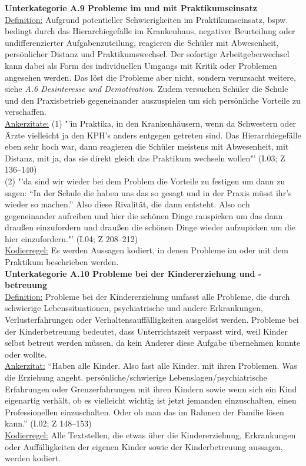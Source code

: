 \textbf{Unterkategorie A.9 Probleme im und mit Praktikumseinsatz}\\
\underline{Definition:} Aufgrund potentieller Schwierigkeiten im Praktikumseinsatz, bspw. bedingt durch das Hierarchiegefälle im Krankenhaus, negativer Beurteilung oder undifferenzierter Aufgabenzuteilung, reagieren die Schüler mit Abwesenheit, persönlicher Distanz und Praktikumswechsel. Der sofortige Arbeitgeberwechsel kann dabei als Form des individuellen Umgangs mit Kritik oder Problemen angesehen werden. Das löst die Probleme aber nicht, sondern verursacht weitere, siehe \textit{A.6 Desinteresse und Demotivation}. Zudem versuchen Schüler die Schule und den Praxisbetrieb gegeneinander auszuspielen um sich persönliche Vorteile zu verschaffen.\\
\underline{Ankerzitate:} (1) "'in Praktika, in den Krankenhäusern, wenn da Schwestern oder Ärzte vielleicht ja den KPH's anders entgegen getreten sind. Das Hierarchiegefälle eben sehr hoch war, dann reagieren die Schüler meistens mit Abwesenheit, mit Distanz, mit ja, das sie direkt gleich das Praktikum wechseln wollen"' (I.03; Z 136--140)\\ (2) "'da sind wir wieder bei dem Problem die Vorteile zu festigen um dann zu sagen: "`In der Schule die haben uns das so gesagt und in der Praxis müsst ihr's wieder so machen."' Also diese Rivalität, die dann entsteht. Also och gegeneinander aufreiben und hier die schönen Dinge rauspicken um das dann draußen einzufordern und draußen die schönen Dinge wieder aufzupicken um die hier einzufordern."' (I.04; Z 208--212)\\
\underline{Kodierregel:} Es werden Aussagen kodiert, in denen Probleme im oder mit dem Praktikum beschrieben werden.\\

\textbf{Unterkategorie A.10 Probleme bei der Kindererziehung und -betreuung}\\
\underline{Definition:} Probleme bei der Kindererziehung umfasst alle Probleme, die durch schwierige Lebenssituationen, psychiatrische und andere Erkrankungen, Verlusterfahrungen oder Verhaltensauffälligkeiten ausgelöst werden. Probleme bei der Kinderbetreuung bedeutet, dass Unterrichtszeit verpasst wird, weil Kinder selbst betreut werden müssen, da kein Anderer diese Aufgabe übernehmen konnte oder wollte. \\
\underline{Ankerzitat:} "`Haben alle Kinder. Also fast alle Kinder. mit ihren Problemen. Was die Erziehung angeht. persönliche/schwierige Lebenslagen/psychiatrische Erfahrungen oder Grenzerfahrungen mit ihren Kindern sowie wenn sich ein Kind eigenartig verhält, ob es vielleicht wichtig ist jetzt jemanden einzuschalten, einen Professionellen einzuschalten. Oder ob man das im Rahmen der Familie lösen kann."' (I.02; Z 148--153)\\
\underline{Kodierregel:} Alle Textstellen, die etwas über die Kindererziehung, Erkrankungen oder Auffälligkeiten der eigenen Kinder sowie der Kinderbetreuung aussagen, werden kodiert.\\

